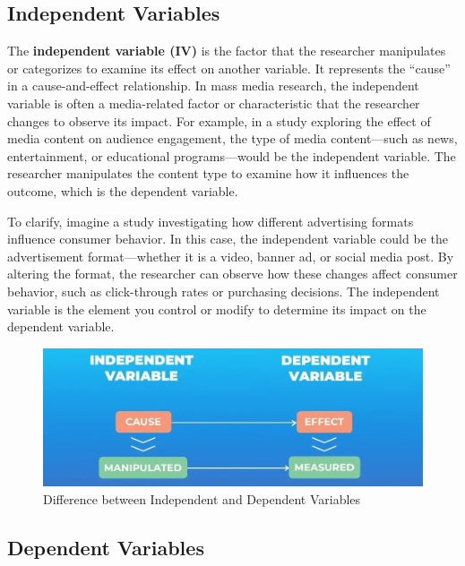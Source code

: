 \documentclass[
]{book}
\begin{document}
\subsection*{Independent Variables}\label{independent-variables}

The \textbf{independent variable (IV)} is the factor that the researcher manipulates or categorizes to examine its effect on another variable. It represents the ``cause'' in a cause-and-effect relationship. In mass media research, the independent variable is often a media-related factor or characteristic that the researcher changes to observe its impact. For example, in a study exploring the effect of media content on audience engagement, the type of media content---such as news, entertainment, or educational programs---would be the independent variable. The researcher manipulates the content type to examine how it influences the outcome, which is the dependent variable.

To clarify, imagine a study investigating how different advertising formats influence consumer behavior. In this case, the independent variable could be the advertisement format---whether it is a video, banner ad, or social media post. By altering the format, the researcher can observe how these changes affect consumer behavior, such as click-through rates or purchasing decisions. The independent variable is the element you control or modify to determine its impact on the dependent variable.

\begin{figure}
\centering
\includegraphics[width=1\linewidth,height=\textheight,keepaspectratio]{images/ind-dep.jpg}
\caption{Difference between Independent and Dependent Variables}
\end{figure}

\subsection*{Dependent Variables}\label{dependent-variables}
\end{document}
